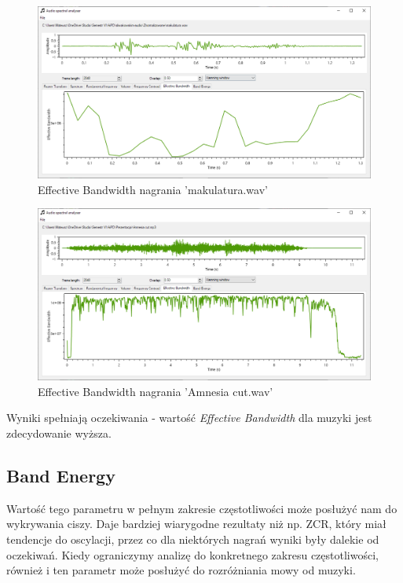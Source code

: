 \documentclass{article}
\begin{document}
\begin{figure}[H]
\includegraphics[width=6in]{scr8.png}
\centering
\caption{Effective Bandwidth nagrania 'makulatura.wav'}
\end{figure}

\begin{figure}[H]
\includegraphics[width=6in]{scr9.png}
\centering
\caption{Effective Bandwidth nagrania 'Amnesia cut.wav'}
\end{figure}

\noindent Wyniki spełniają oczekiwania - wartość \textit{Effective Bandwidth} dla muzyki jest zdecydowanie wyższa.

\subsection{Band Energy}
Wartość tego parametru w pełnym zakresie częstotliwości może posłużyć nam do wykrywania ciszy. Daje bardziej wiarygodne rezultaty niż np. ZCR, który miał tendencje do oscylacji, przez co dla niektórych nagrań wyniki były dalekie od oczekiwań. Kiedy ograniczymy analizę do konkretnego zakresu częstotliwości, również i ten parametr może posłużyć do rozróżniania mowy od muzyki.
\end{document}

